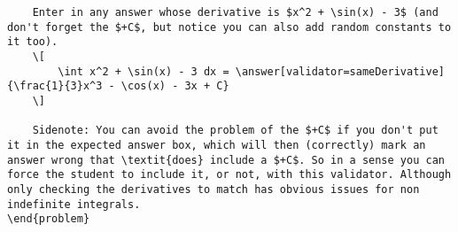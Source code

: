 \documentclass{ximera}
\begin{document}
\begin{verbatim}
    Enter in any answer whose derivative is $x^2 + \sin(x) - 3$ (and don't forget the $+C$, but notice you can also add random constants to it too).
    \[
        \int x^2 + \sin(x) - 3 dx = \answer[validator=sameDerivative]{\frac{1}{3}x^3 - \cos(x) - 3x + C}
    \]
    
    Sidenote: You can avoid the problem of the $+C$ if you don't put it in the expected answer box, which will then (correctly) mark an answer wrong that \textit{does} include a $+C$. So in a sense you can force the student to include it, or not, with this validator. Although only checking the derivatives to match has obvious issues for non indefinite integrals.
\end{problem}
\end{verbatim}
\end{document}
